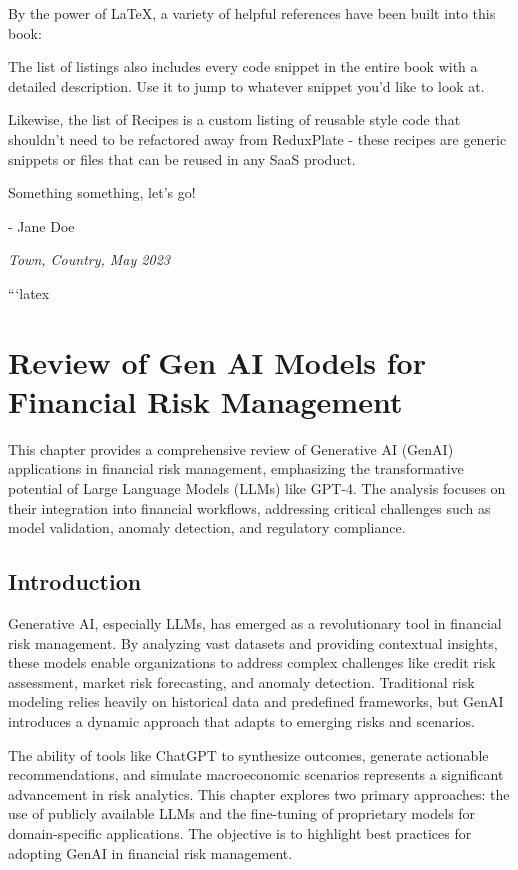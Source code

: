 \documentclass[a4paper,headinclude=on,footinclude=on,12pt,oneside]{scrbook}
\begin{document}

By the power of LaTeX, a variety of helpful references have been built into this book:



The list of listings also includes every code snippet in the entire book with a detailed description. Use it to jump to whatever snippet you'd like to look at.

Likewise, the list of Recipes is a custom listing of reusable style code that shouldn't need to be refactored away from ReduxPlate - these recipes are generic snippets or files that can be reused in any SaaS product.


Something something, let's go!

- Jane Doe

\textit{Town, Country, May 2023}


```latex

\chapter{Review of Gen AI Models for Financial Risk Management}

This chapter provides a comprehensive review of Generative AI (GenAI) applications in financial risk management, emphasizing the transformative potential of Large Language Models (LLMs) like GPT-4. The analysis focuses on their integration into financial workflows, addressing critical challenges such as model validation, anomaly detection, and regulatory compliance. 

\section{Introduction}

Generative AI, especially LLMs, has emerged as a revolutionary tool in financial risk management. By analyzing vast datasets and providing contextual insights, these models enable organizations to address complex challenges like credit risk assessment, market risk forecasting, and anomaly detection. Traditional risk modeling relies heavily on historical data and predefined frameworks, but GenAI introduces a dynamic approach that adapts to emerging risks and scenarios.

The ability of tools like ChatGPT to synthesize outcomes, generate actionable recommendations, and simulate macroeconomic scenarios represents a significant advancement in risk analytics. This chapter explores two primary approaches: the use of publicly available LLMs and the fine-tuning of proprietary models for domain-specific applications. The objective is to highlight best practices for adopting GenAI in financial risk management.
\end{document}
